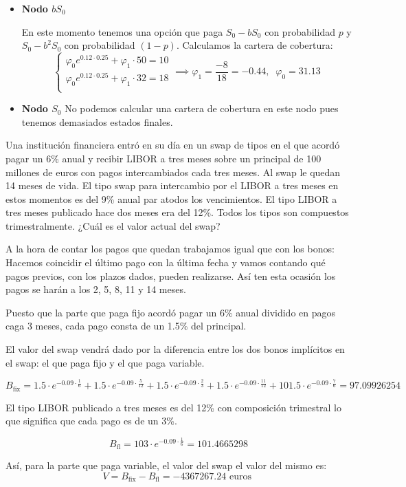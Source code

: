 \begin{problem}[2]
\begin{itemize}
\item \textbf{Nodo $bS_0$}

En este momento tenemos una opción que paga $S_0-bS_0$ con probabilidad $p$ y $S_0-b^2S_0$ con probabilidad $(1-p)$. Calculamos la cartera de cobertura:
\[\left\{\begin{array}{l}
\varphi_0 e^{0.12\cdot 0.25}+\varphi_1 \cdot 50 = 10 \\
\varphi_0 e^{0.12\cdot 0.25}+\varphi_1 \cdot 32 = 18 \\
\end{array}\right. \implies \varphi_1 = \frac{-8}{18} = -0.44, \;\; \varphi_0 = 31.13\]

\item \textbf{Nodo $S_0$}
No podemos calcular una cartera de cobertura en este nodo pues tenemos demasiados estados finales.
\end{itemize}

\end{problem}

\begin{problem}[3]
Una institución financiera entró en su día en un swap de tipos en el que acordó pagar un 6\% anual y recibir LIBOR a tres meses sobre un principal de 100 millones de euros con pagos intercambiados cada tres meses. Al swap le quedan 14 meses de vida. El tipo swap para intercambio por el LIBOR a tres meses en estos momentos es del 9\% anual par atodos los vencimientos. El tipo LIBOR a tres meses publicado hace dos meses era del 12\%. Todos los tipos son compuestos trimestralmente. ¿Cuál es el valor actual del swap?
\solution
{}

A la hora de contar los pagos que quedan trabajamos igual que con los bonos: Hacemos coincidir el último pago con la última fecha y vamos contando qué
pagos previos, con los plazos dados, pueden realizarse. Así ten esta ocasión los pagos se harán a los 2, 5, 8, 11 y 14 meses.

Puesto que la parte que paga fijo acordó pagar un 6\% anual dividido en pagos caga 3 meses, cada pago consta de un 1.5\% del principal.

El valor del swap vendrá dado por la diferencia entre los dos bonos implícitos en el swap: el que paga fijo y el que paga variable.

\[B_{\text{fix}} = 1.5\cdot e^{-0.09\cdot \frac{1}{6}} + 1.5\cdot e^{-0.09\cdot \frac{5}{12}} + 1.5\cdot e^{-0.09\cdot \frac{2}{3}} + 1.5\cdot e^{-0.09\cdot \frac{11}{12}} + 101.5\cdot e^{-0.09\cdot \frac{7}{6}} = 97.09926254\]

El tipo LIBOR publicado a tres meses es del 12\% con composición trimestral lo que significa que cada pago es de un 3\%.

\[B_{\text{fl}} = 103\cdot e^{-0.09\cdot \frac{1}{6}} = 101.4665298\]

Así, para la parte que paga variable, el valor del swap el valor del mismo es:
\[V = B_{\text{fix}} - B_{\text{fl}} = -4367267.24 \text{ euros }\]

\end{problem}

